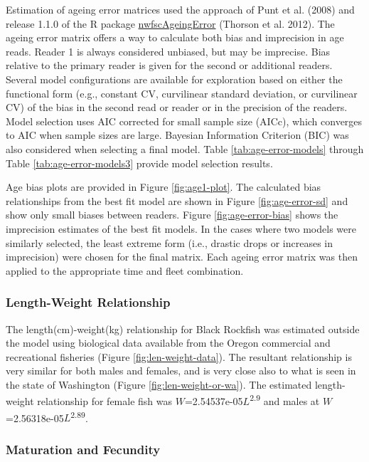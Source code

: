 \documentclass[11pt,
  letterpaper,
]{article}
\begin{document}
Estimation of ageing error matrices used the approach of Punt et al. (2008) and release 1.1.0 of the R package \href{https://github.com/pfmc-assessment/nwfscAgeingError}{nwfscAgeingError} (Thorson et al. 2012). The ageing error matrix offers a way to calculate both bias and imprecision in age reads. Reader 1 is always considered unbiased, but may be imprecise. Bias relative to the primary reader is given for the second or additional readers. Several model configurations are available for exploration based on either the functional form (e.g., constant CV, curvilinear standard deviation, or curvilinear CV) of the bias in the second read or reader or in the precision of the readers. Model selection uses AIC corrected for small sample size (AICc), which converges to AIC when sample sizes are large. Bayesian Information Criterion (BIC) was also considered when selecting a final model. Table \ref{tab:age-error-models} through Table \ref{tab:age-error-models3} provide model selection results.

Age bias plots are provided in Figure \ref{fig:age1-plot}. The calculated bias relationships from the best fit model are shown in Figure \ref{fig:age-error-sd} and show only small biases between readers. Figure \ref{fig:age-error-bias} shows the imprecision estimates of the best fit models. In the cases where two models were similarly selected, the least extreme form (i.e., drastic drops or increases in imprecision) were chosen for the final matrix. Each ageing error matrix was then applied to the appropriate time and fleet combination.

\hypertarget{length-weight-relationship}{%
\subsubsection{Length-Weight Relationship}\label{length-weight-relationship}}

The length(cm)-weight(kg) relationship for Black Rockfish was estimated outside the model using biological data available from the Oregon commercial and recreational fisheries (Figure \ref{fig:len-weight-data}). The resultant relationship is very similar for both males and females, and is very close also to what is seen in the state of Washington (Figure \ref{fig:len-weight-or-wa}). The estimated length-weight relationship for female fish was \(W\)=2.54537e-05\(L\)\textsuperscript{2.9} and males at \(W\)=2.56318e-05\(L\)\textsuperscript{2.89}.

\hypertarget{maturation-and-fecundity}{%
\subsubsection{Maturation and Fecundity}\label{maturation-and-fecundity}}
\end{document}

